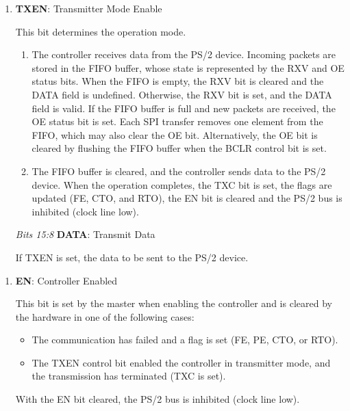 \documentclass[]{article}
\begin{document}
\begin{description}[style=nextline]
\begin{enumerate}[
            label=\emph{Bit \arabic*}, widest=s 15:8,
            left=\parindent, align=left,
            itemsep=2.5\itemsep,
            start=0
        ]
        \item \textbf{TXEN}: Transmitter Mode Enable
        
        This bit determines the operation mode.
        \begin{enumerate}[label=\arabic*:, start=0]
            \item The controller receives data from the PS/2 device.
            Incoming packets are stored in the FIFO buffer, whose state is represented by the RXV and OE status bits. When the FIFO is empty, the RXV bit is cleared and the DATA field is undefined. Otherwise, the RXV bit is set, and the DATA field is valid. If the FIFO buffer is full and new packets are received, the OE status bit is set. Each SPI transfer removes one element from the FIFO, which may also clear the OE bit. Alternatively, the OE bit is cleared by flushing the FIFO buffer when the BCLR control bit is set.
    
            \item The FIFO buffer is cleared, and the controller sends data to the PS/2 device. When the operation completes, the TXC bit is set, the flags are updated (FE, CTO, and RTO), the EN bit is cleared and the PS/2 bus is inhibited (clock line low).
        \end{enumerate}
    
        \item[\emph{Bits 15:8}] \textbf{DATA}: Transmit Data
        
        If TXEN is set, the data to be sent to the PS/2 device.
    \end{enumerate}
    
    \item[MISO Packet]\hfill
    
        \begin{enumerate}[
            label=\emph{Bit \arabic*}, widest=s 15:8,
            left=\parindent, align=left,
            itemsep=2.5\itemsep,
            start=0
        ]
            \item \textbf{EN}: Controller Enabled
            
            This bit is set by the master when enabling the controller and is cleared by the hardware in one of the following cases:
            \begin{itemize}
                \item The communication has failed and a flag is set (FE, PE, CTO, or RTO).
                \item The TXEN control bit enabled the controller in transmitter mode, and the transmission has terminated (TXC is set).
            \end{itemize}
            With the EN bit cleared, the PS/2 bus is inhibited (clock line low).
            

\end{enumerate}
\end{description}
\end{document}

